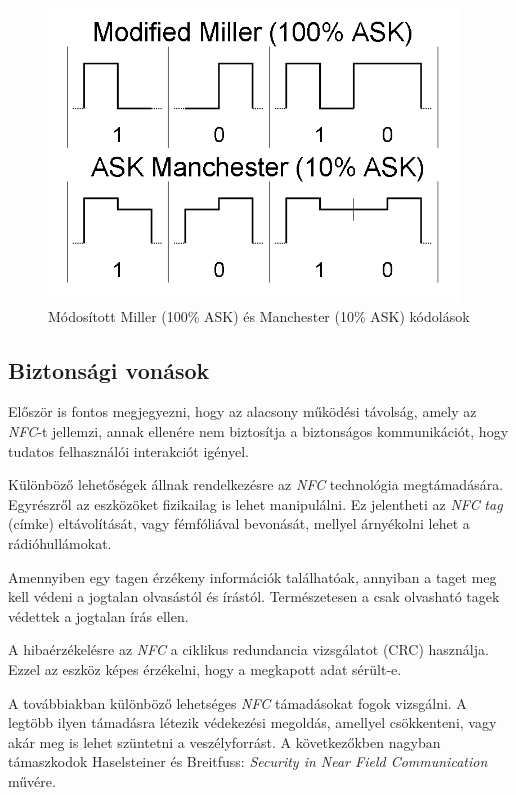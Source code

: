 \documentclass[12pt]{article}
\begin{document}
\begin{figure}[h]
	\centering
	\includegraphics{kodolas}
	\caption{Módosított Miller (100\% ASK) és Manchester (10\% ASK) kódolások}		\label{fig:kodolas}
\end{figure}

\subsection{Biztonsági vonások}
Először is fontos megjegyezni, hogy az alacsony működési távolság, amely az \emph{NFC}-t
jellemzi, annak ellenére nem biztosítja a biztonságos kommunikációt, hogy tudatos
felhasználói interakciót igényel.

Különböző lehetőségek állnak rendelkezésre az \emph{NFC} technológia megtámadására.
Egyrészről az eszközöket fizikailag is lehet manipulálni. Ez jelentheti az \emph{NFC}
\emph{tag} (címke) eltávolítását, vagy fémfóliával bevonását, mellyel árnyékolni lehet
a rádióhullámokat.

Amennyiben egy tagen érzékeny információk találhatóak, annyiban a taget meg kell
védeni a  jogtalan olvasástól és írástól. Természetesen a csak olvasható tagek
védettek a jogtalan írás ellen.

A hibaérzékelésre az \emph{NFC} a ciklikus redundancia vizsgálatot (CRC) használja.
Ezzel az eszköz képes érzékelni, hogy a megkapott adat sérült-e. 

A továbbiakban különböző lehetséges \emph{NFC} támadásokat fogok vizsgálni. A legtöbb
ilyen támadásra létezik védekezési megoldás, amellyel csökkenteni, vagy akár 
meg is lehet szüntetni a veszélyforrást. A következőkben nagyban támaszkodok
Haselsteiner és Breitfuss: \emph{Security in Near Field Communication}
\cite{nemetbiztonsagnfc} művére.
\end{document}
